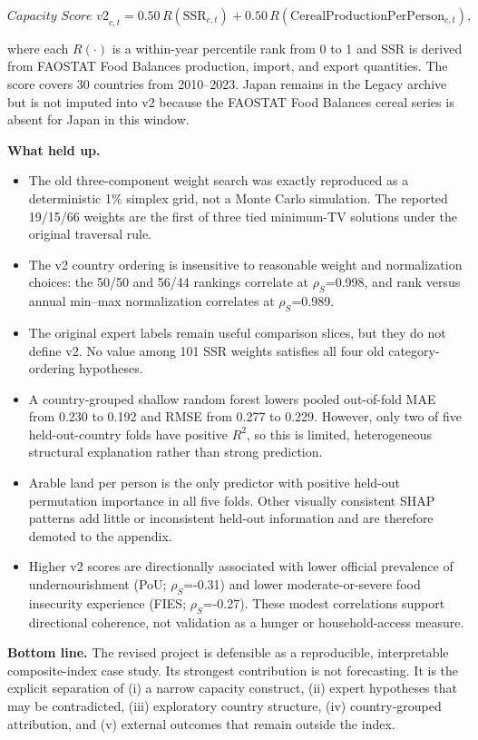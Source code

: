 \documentclass[11pt]{article}
\newcommand{\score}{\textit{Capacity Score v2}}
\newcommand{\rhoS}{\ensuremath{\rho_{S}}}
\begin{document}
\[
\score_{c,t}=0.50\,R(\mathrm{SSR}_{c,t})+0.50\,R(\mathrm{CerealProductionPerPerson}_{c,t}),
\]

where each $R(\cdot)$ is a within-year percentile rank from 0 to 1 and SSR is derived from FAOSTAT Food Balances production, import, and export quantities. The score covers 30 countries from 2010--2023. Japan remains in the Legacy archive but is not imputed into v2 because the FAOSTAT Food Balances cereal series is absent for Japan in this window.

\textbf{What held up.}

\begin{itemize}
  \item The old three-component weight search was exactly reproduced as a deterministic 1\% simplex grid, not a Monte Carlo simulation. The reported 19/15/66 weights are the first of three tied minimum-TV solutions under the original traversal rule.
  \item The v2 country ordering is insensitive to reasonable weight and normalization choices: the 50/50 and 56/44 rankings correlate at \rhoS=0.998, and rank versus annual min--max normalization correlates at \rhoS=0.989.
  \item The original expert labels remain useful comparison slices, but they do not define v2. No value among 101 SSR weights satisfies all four old category-ordering hypotheses.
  \item A country-grouped shallow random forest lowers pooled out-of-fold MAE from 0.230 to 0.192 and RMSE from 0.277 to 0.229. However, only two of five held-out-country folds have positive $R^2$, so this is limited, heterogeneous structural explanation rather than strong prediction.
  \item Arable land per person is the only predictor with positive held-out permutation importance in all five folds. Other visually consistent SHAP patterns add little or inconsistent held-out information and are therefore demoted to the appendix.
  \item Higher v2 scores are directionally associated with lower official prevalence of undernourishment (PoU; \rhoS=-0.31) and lower moderate-or-severe food insecurity experience (FIES; \rhoS=-0.27). These modest correlations support directional coherence, not validation as a hunger or household-access measure.
\end{itemize}

\textbf{Bottom line.} The revised project is defensible as a reproducible, interpretable composite-index case study. Its strongest contribution is not forecasting. It is the explicit separation of (i) a narrow capacity construct, (ii) expert hypotheses that may be contradicted, (iii) exploratory country structure, (iv) country-grouped attribution, and (v) external outcomes that remain outside the index.
\end{document}
